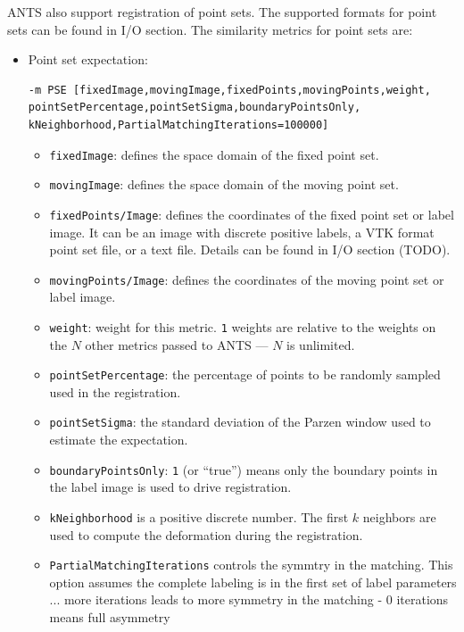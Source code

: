 \documentclass{InsightArticle}
\begin{document}
ANTS also support registration of point sets. The supported formats for point sets can be found in I/O section. The similarity metrics for point sets are:
\begin{itemize}
    \item Point set expectation: 
     \begin{verbatim}
-m PSE [fixedImage,movingImage,fixedPoints,movingPoints,weight,
pointSetPercentage,pointSetSigma,boundaryPointsOnly,
kNeighborhood,PartialMatchingIterations=100000]
    \end{verbatim}
    \begin{itemize}
        \item \verb"fixedImage": defines the space domain of the fixed point set.
        \item \verb"movingImage": defines the space domain of the moving point set.
        \item \verb"fixedPoints/Image": defines the coordinates of the fixed point set or label image. It can be an image with discrete positive labels, a VTK format point set file, or a text file. Details can be found in I/O section (TODO).
        \item \verb"movingPoints/Image": defines the coordinates of the moving point set or label image. 
        \item \verb"weight": weight for this metric. \verb"1" weights are relative to the weights on the $N$ other metrics passed to ANTS --- $N$ is unlimited.
        \item \verb"pointSetPercentage": the percentage of points to be randomly sampled used in the registration.
        \item \verb"pointSetSigma": the standard deviation of the Parzen window used to estimate the expectation. 
        \item \verb"boundaryPointsOnly":  \verb"1" (or ``true'') means only the boundary points in the label image is used to drive registration.
        \item \verb"kNeighborhood" is a positive discrete number. The first $k$ neighbors are used to compute the deformation during the registration. 
        \item \verb"PartialMatchingIterations" controls the symmtry in the matching. This option assumes the complete labeling is in the first set of label parameters ... more iterations leads to more symmetry in the matching  - 0 iterations means full asymmetry 
    \end{itemize}


\end{itemize}
\end{document}

